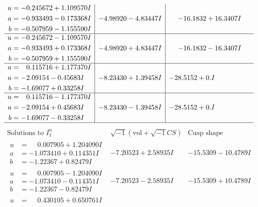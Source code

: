 \documentclass[1p]{elsarticle_modified}
\theoremstyle{definition}
\newcommand{\I}{\sqrt{-1}}
\begin{document}
$$\begin{array}{c|c|c}
\begin{aligned}
u &= -0.245672 + 1.109570 I \\
a &= -0.933493 - 0.173368 I \\
b &= -0.507959 - 1.155590 I\end{aligned}
 & -4.98920 - 4.83447 I & -16.1832 + 16.3407 I \\ \hline\begin{aligned}
u &= -0.245672 - 1.109570 I \\
a &= -0.933493 + 0.173368 I \\
b &= -0.507959 + 1.155590 I\end{aligned}
 & -4.98920 + 4.83447 I & -16.1832 - 16.3407 I \\ \hline\begin{aligned}
u &= \phantom{-}0.115716 + 1.177370 I \\
a &= -2.09154 - 0.45683 I \\
b &= -1.69077 + 0.33258 I\end{aligned}
 & -8.23430 + 1.39458 I & -28.5152 + 0. I\phantom{ +0.000000I} \\ \hline\begin{aligned}
u &= \phantom{-}0.115716 - 1.177370 I \\
a &= -2.09154 + 0.45683 I \\
b &= -1.69077 - 0.33258 I\end{aligned}
 & -8.23430 - 1.39458 I & -28.5152 + 0. I\phantom{ +0.000000I}\\
 \hline 
 \end{array}$$\newpage$$\begin{array}{c|c|c}  
\text{Solutions to }I^u_{1}& \I (\text{vol} + \sqrt{-1}CS) & \text{Cusp shape}\\
 \hline 
\begin{aligned}
u &= \phantom{-}0.007905 + 1.204090 I \\
a &= -1.073410 + 0.114351 I \\
b &= -1.22367 + 0.82479 I\end{aligned}
 & -7.20523 + 2.58935 I & -15.5309 - 10.4789 I \\ \hline\begin{aligned}
u &= \phantom{-}0.007905 - 1.204090 I \\
a &= -1.073410 - 0.114351 I \\
b &= -1.22367 - 0.82479 I\end{aligned}
 & -7.20523 - 2.58935 I & -15.5309 + 10.4789 I \\ \hline\begin{aligned}
u &= \phantom{-}0.430105 + 0.650761 I \\

\end{aligned}
\end{array}$$
\end{document}
